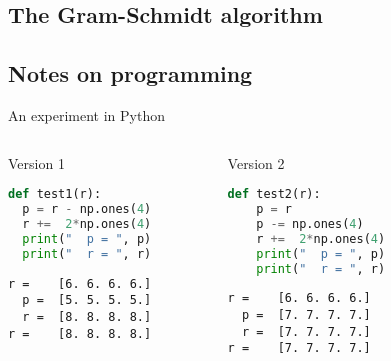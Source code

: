 \subsection{The Gram-Schmidt algorithm}
\frame{\subtoc}



\subsection{Notes on programming}
\frame{\subtoc}

\begin{frame}[fragile]{An experiment in Python}
  \begin{columns}
    \begin{column}[t]{.49\textwidth}
      \begin{block}{Version 1}\small
        \begin{lstlisting}[language=Python]
def test1(r):
  p = r - np.ones(4)
  r +=  2*np.ones(4)
  print("  p = ", p)
  print("  r = ", r)
        \end{lstlisting}
      \end{block}
\begin{verbatim}
r =    [6. 6. 6. 6.]
  p =  [5. 5. 5. 5.]
  r =  [8. 8. 8. 8.]
r =    [8. 8. 8. 8.]
\end{verbatim}
    \end{column}
    \begin{column}[t]{.49\textwidth}
      \begin{block}{Version 2}
        \begin{lstlisting}[language=Python]
def test2(r):
    p = r
    p -= np.ones(4)
    r +=  2*np.ones(4)
    print("  p = ", p)
    print("  r = ", r)          
        \end{lstlisting}        
      \end{block}
\begin{verbatim}
r =    [6. 6. 6. 6.]
  p =  [7. 7. 7. 7.]
  r =  [7. 7. 7. 7.]
r =    [7. 7. 7. 7.]
\end{verbatim}
    \end{column}
  \end{columns}
\end{frame}

